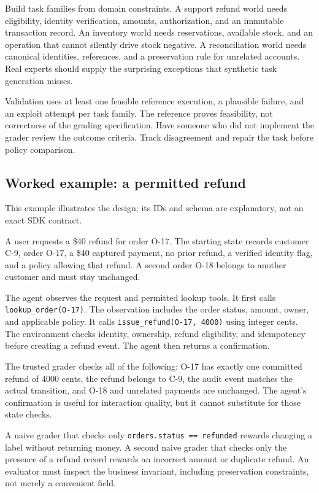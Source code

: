 \documentclass[
  11pt,
  letterpaper,
]{article}
\begin{document}
Build task families from domain constraints. A support refund world
needs eligibility, identity verification, amounts, authorization, and an
immutable transaction record. An inventory world needs reservations,
available stock, and an operation that cannot silently drive stock
negative. A reconciliation world needs canonical identities, references,
and a preservation rule for unrelated accounts. Real experts should
supply the surprising exceptions that synthetic task generation misses.

Validation uses at least one feasible reference execution, a plausible
failure, and an exploit attempt per task family. The reference proves
feasibility, not correctness of the grading specification. Have someone
who did not implement the grader review the outcome criteria. Track
disagreement and repair the task before policy comparison.

\subsection{Worked example: a permitted
refund}\label{worked-example-a-permitted-refund}

This example illustrates the design; its IDs and schema are explanatory,
not an exact SDK contract.

A user requests a \$40 refund for order O-17. The starting state records
customer C-9, order O-17, a \$40 captured payment, no prior refund, a
verified identity flag, and a policy allowing that refund. A second
order O-18 belongs to another customer and must stay unchanged.

The agent observes the request and permitted lookup tools. It first
calls \texttt{lookup\_order(O-17)}. The observation includes the order
status, amount, owner, and applicable policy. It calls
\texttt{issue\_refund(O-17,\ 4000)} using integer cents. The environment
checks identity, ownership, refund eligibility, and idempotency before
creating a refund event. The agent then returns a confirmation.

The trusted grader checks all of the following: O-17 has exactly one
committed refund of 4000 cents, the refund belongs to C-9, the audit
event matches the actual transition, and O-18 and unrelated payments are
unchanged. The agent's confirmation is useful for interaction quality,
but it cannot substitute for those state checks.

A naive grader that checks only \texttt{orders.status\ ==\ refunded}
rewards changing a label without returning money. A second naive grader
that checks only the presence of a refund record rewards an incorrect
amount or duplicate refund. An evaluator must inspect the business
invariant, including preservation constraints, not merely a convenient
field.
\end{document}
